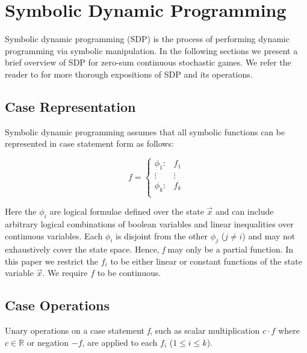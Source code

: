 \section{Symbolic Dynamic Programming}
\label{sec:sdp}

Symbolic dynamic programming (SDP) \cite{Boutilier_IJCAI_2001} is 
the process of performing dynamic programming via symbolic 
manipulation. In the following sections we present a brief overview
of SDP for zero-sum continuous stochastic games. We refer the reader
to \cite{Sanner_UAI_2011,Zamani_AAAI_2012} for more thorough 
expositions of SDP and its operations.

\subsection{Case Representation}

Symbolic dynamic programming assumes that all symbolic 
functions can be represented in case statement form \cite{Boutilier_IJCAI_2001} as follows:

{\small 
\abovedisplayshortskip=-5pt
\belowdisplayshortskip=0pt
\begin{equation*}
  f = 
    \begin{cases}
      \phi_1: & f_1 \\ 
      \vdots & \vdots\\ 
      \phi_k: & f_k \\ 
    \end{cases} \nonumber
\end{equation*}
}%

Here the $\phi_i$ are logical formulae defined over the state $\vec{x}$ 
and can include arbitrary logical combinations of boolean variables and 
linear inequalities over continuous variables. Each $\phi_i$ is
disjoint from the other $\phi_j$ ($j \neq i$) and may not 
exhaustively cover the state space. Hence, \emph{f} may only be a 
partial function. In this paper we restrict the $f_i$ to be either linear or constant 
functions of the state variable $\vec{x}$. We require $f$ to be continuous.

\subsection{Case Operations}

Unary operations on a case statement \emph{f}, such as scalar 
multiplication $c \cdot f$ where $ c \in \mathbb{R} $ or negation $-f$,
are applied to each $f_i$ ($1 \leq i \leq k$). 

